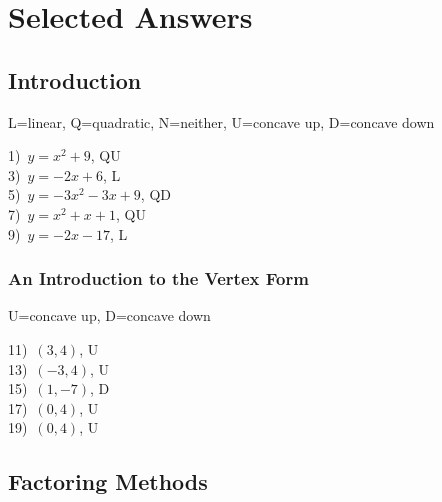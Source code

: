 \documentclass[12pt]{book}
\theoremstyle{definition}
\begin{document}
\section{Selected Answers}
\subsection*{Introduction}
 L=linear, Q=quadratic, N=neither, U=concave up, D=concave down
\begin{multicols}{3}
  1)~$y=x^2 + 9$, QU\\
	3)~$y=-2x+6$, L\\
	5)~$y=-3x^2-3x+9$, QD\\
  7)~$y=x^2+x+1$, QU\\
  9)~$y=-2x-17$, L%
\end{multicols}

\subsubsection{An Introduction to the Vertex Form} 

U=concave up, D=concave down%

\begin{multicols}{5}
  11)~$(3,4)$, U\\
  13)~$(-3,4)$, U\\
  15)~$(1,-7)$, D\\
  17)~$(0,4)$, U\\
  19)~$(0,4)$, U%
\end{multicols}

\subsection*{Factoring Methods}
\end{document}
